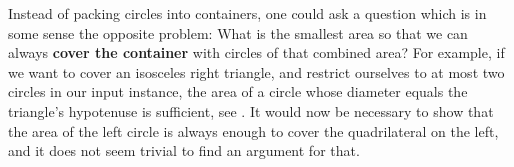 \documentclass[a4paper,style=print,bibliography=totoc,nexus,lnum,extramargin]{tubsbook}
\begin{document}
Instead of packing circles into containers, one could ask a question which is in some sense the opposite problem: What is the smallest area so that we can always \textbf{cover the container} with circles of that combined area? For example, if we want to cover an isosceles right triangle, and restrict ourselves to at most two circles in our input instance, the area of a circle whose diameter equals the triangle's hypotenuse is sufficient, see . It would now be necessary to show that the area of the left circle is always enough to cover the quadrilateral on the left, and it does not seem trivial to find an argument for that.


\printbibliography
\end{document}
